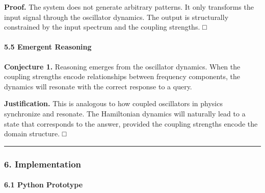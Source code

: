 \documentclass[
  11pt,
  a4paper,
]{article}
\begin{document}
\textbf{Proof.} The system does not generate arbitrary patterns. It only
transforms the input signal through the oscillator dynamics. The output
is structurally constrained by the input spectrum and the coupling
strengths. □

\paragraph{5.5 Emergent Reasoning}\label{emergent-reasoning}

\textbf{Conjecture 1.} Reasoning emerges from the oscillator dynamics.
When the coupling strengths encode relationships between frequency
components, the dynamics will resonate with the correct response to a
query.

\textbf{Justification.} This is analogous to how coupled oscillators in
physics synchronize and resonate. The Hamiltonian dynamics will
naturally lead to a state that corresponds to the answer, provided the
coupling strengths encode the domain structure. □

\begin{center}\rule{0.5\linewidth}{0.5pt}\end{center}

\subsubsection{6. Implementation}\label{implementation-6}

\paragraph{6.1 Python Prototype}\label{python-prototype-1}
\end{document}
